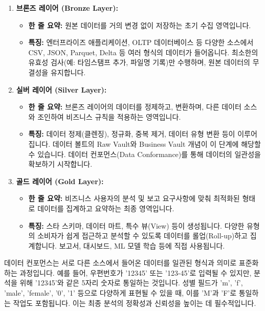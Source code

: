 \documentclass[11pt,a4paper]{article}
\theoremstyle{definition}
\begin{document}
\begin{enumerate}
    \item \textbf{브론즈 레이어 (Bronze Layer):}
    \begin{itemize}
        \item \textbf{한 줄 요약:} 원본 데이터를 거의 변경 없이 저장하는 초기 수집 영역입니다.
        \item \textbf{특징:} 엔터프라이즈 애플리케이션, OLTP 데이터베이스 등 다양한 소스에서 CSV, JSON, Parquet, Delta 등 여러 형식의 데이터가 들어옵니다. 최소한의 유효성 검사(예: 타임스탬프 추가, 파일명 기록)만 수행하며, 원본 데이터의 무결성을 유지합니다.
    \end{itemize}

    \item \textbf{실버 레이어 (Silver Layer):}
    \begin{itemize}
        \item \textbf{한 줄 요약:} 브론즈 레이어의 데이터를 정제하고, 변환하며, 다른 데이터 소스와 조인하여 비즈니스 규칙을 적용하는 영역입니다.
        \item \textbf{특징:} 데이터 정제(클렌징), 정규화, 중복 제거, 데이터 유형 변환 등이 이루어집니다. 데이터 볼트의 Raw Vault와 Business Vault 개념이 이 단계에 해당할 수 있습니다. 데이터 컨포먼스(Data Conformance)를 통해 데이터의 일관성을 확보하기 시작합니다.
    \end{itemize}

    \item \textbf{골드 레이어 (Gold Layer):}
    \begin{itemize}
        \item \textbf{한 줄 요약:} 비즈니스 사용자의 분석 및 보고 요구사항에 맞춰 최적화된 형태로 데이터를 집계하고 요약하는 최종 영역입니다.
        \item \textbf{특징:} 스타 스키마, 데이터 마트, 특수 뷰(View) 등이 생성됩니다. 다양한 유형의 소비자가 쉽게 접근하고 분석할 수 있도록 데이터를 롤업(Roll-up)하고 집계합니다. 보고서, 대시보드, ML 모델 학습 등에 직접 사용됩니다.
    \end{itemize}
\end{enumerate}

\begin{tcolorbox}[summary, title=데이터 컨포먼스 (Data Conformance)]
데이터 컨포먼스는 서로 다른 소스에서 들어온 데이터를 일관된 형식과 의미로 표준화하는 과정입니다. 예를 들어, 우편번호가 '12345' 또는 '123-45'로 입력될 수 있지만, 분석을 위해 '12345'와 같은 5자리 숫자로 통일하는 것입니다. 성별 필드가 'm', 'f', 'male', 'female', '0', '1' 등으로 다양하게 표현될 수 있을 때, 이를 'M'과 'F'로 통일하는 작업도 포함됩니다. 이는 최종 분석의 정확성과 신뢰성을 높이는 데 필수적입니다.
\end{tcolorbox}
\end{document}
